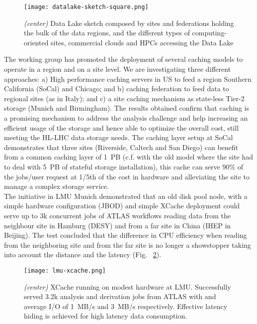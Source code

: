 \begin{figure}
  \centering
  \texttt{[image: datalake-sketch-square.png]}
  \caption{{\em (center)} Data Lake sketch composed by sites and federations holding the bulk of the data regions, and the different types of computing-oriented sites, commercial clouds and HPCs accessing the Data Lake }
  \label{datalake-sketch}
\end{figure}
The working group has promoted the deployment of several caching models to operate in a region and on a site level. We are investigating three different approaches: a) High performance caching servers in US to feed a region Southern California (SoCal) and Chicago; and b) caching federation to feed data to regional sites (as in Italy); and c) a site caching mechanism as state-less Tier-2 storage (Munich and Birmingham). The results obtained confirm that caching is a promising mechanism to address the analysis challenge and help increasing an efficient usage of the storage and hence able to optimize the overall cost, still meeting the
HL-LHC data storage needs. The caching layer setup at SoCal demonstrates that three sites (Riverside, Caltech and San Diego) can benefit from a common caching layer of 1~PB (c.f. with the old model where the site had to deal with 5~PB of stateful storage installation), this cache can serve 90\% of the jobs/user request at 1/5th of the cost in hardware and alleviating the site to manage a complex storage service.\\
The initiative in LMU Munich demonstrated that an old disk pool node, with a simple hardware configuration (JBOD) and simple XCache deployment could serve up to 3k concurrent jobs of ATLAS workflows reading data from the neighbour site in Hamburg (DESY) and from a far site in China (IHEP in Beijing). The test concluded that the difference in CPU efficiency when reading from the neighboring site and from the far site is no longer a showstopper taking into account the distance and the latency (Fig. ~\ref{lmu-xcache}).\\

\begin{figure}[h]
  \centering
  \texttt{[image: lmu-xcache.png]}
  \caption{{\em (center)} XCache running on modest hardware at LMU. Successfully served 3.2k analysis and derivation jobs from ATLAS with and average I/O of 1~MB/s and 3~MB/s respectively. Effective latency hiding is achieved for high latency data consumption.}
  \label{lmu-xcache}
\end{figure}




